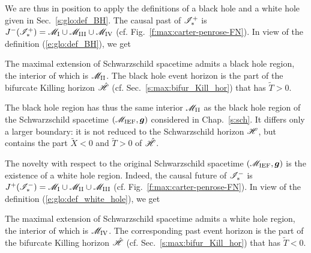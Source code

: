 We are thus in position to apply the definitions of a black hole and a white hole
given in Sec.~\ref{s:glo:def_BH}. The
causal past of $\mathscr{I}^+_*$ is $J^-(\mathscr{I}^+_*) = \mathscr{M}_{\rm I}\cup \mathscr{M}_{\rm III}\cup \mathscr{M}_{\rm IV}$
(cf. Fig.~\ref{f:max:carter-penrose-FN}). In view of the definition
(\ref{e:glo:def_BH}), we get
\begin{prop}
The maximal extension of Schwarzschild spacetime admits a black hole region,
the interior of which is $\mathscr{M}_{\rm II}$. The black hole event horizon is the
part of the bifurcate Killing horizon $\hat{\mathscr{H}}$ (cf. Sec.~\ref{s:max:bifur_Kill_hor})
that has $\tilde{T}>0$.
\end{prop}
The black hole region has thus the same interior $\mathscr{M}_{\rm II}$ as the black hole region
of the Schwarzschild spacetime $(\mathscr{M}_{\rm IEF}, \bm{g})$ considered in Chap.~\ref{s:sch}.
It differs only a larger boundary: it is not reduced to the Schwarzschild horizon $\mathscr{H}$,
but contains the part $\tilde{X}<0$ and $\tilde{T}>0$ of $\hat{\mathscr{H}}$.

The novelty with respect to the original Schwarzschild spacetime $(\mathscr{M}_{\rm IEF}, \bm{g})$
is the existence of a white hole region. Indeed, the causal future of $\mathscr{I}^-_*$ is
$J^+(\mathscr{I}^-_*) = \mathscr{M}_{\rm I}\cup \mathscr{M}_{\rm II}\cup \mathscr{M}_{\rm III}$
(cf. Fig.~\ref{f:max:carter-penrose-FN}). In view of the definition
(\ref{e:glo:def_white_hole}), we get
\begin{prop}
The maximal extension of Schwarzschild spacetime admits a white hole region,
the interior of which is $\mathscr{M}_{\rm IV}$. The corresponding past event horizon is the
part of the bifurcate Killing horizon $\hat{\mathscr{H}}$ (cf. Sec.~\ref{s:max:bifur_Kill_hor})
that has $\tilde{T}<0$.
\end{prop}


